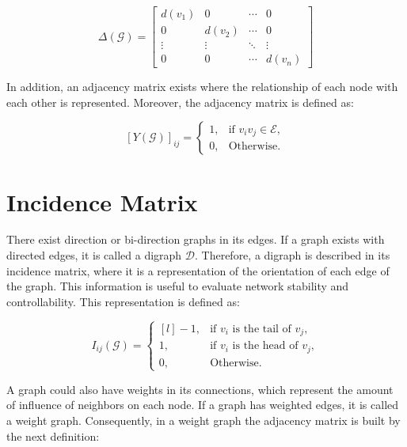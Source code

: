 \begin{equation}
    \Delta (\mathcal{G}) = \begin{bmatrix}
d(v_{1}) &   0    &  \cdots & 0\\ 
0      & d(v_{2}) & \cdots &  0 \\ 
\vdots & \vdots   & \ddots  & \vdots\\ 
0      & 0        & \cdots & d(v_{n}) 
  \end{bmatrix}
\end{equation}

In addition, an adjacency matrix exists where the relationship of each node with each other is represented. Moreover, the adjacency matrix is defined as:

\begin{equation}
    \left [ Y(\mathcal{G}) \right ]_{ij} = \left\{\begin{matrix}
1, & \text{if } v_{i}v_{j} \in \mathcal{E},\\ 
0, & \text{Otherwise.} 
\end{matrix}\right.
\end{equation}

\section*{Incidence Matrix}
There exist direction or bi-direction graphs in its edges. If a graph exists with directed edges, it is called a digraph $\mathcal{D}$. Therefore, a digraph is described in its incidence matrix, where it is a representation of the orientation of each edge of the graph. This information is useful to evaluate network stability and controllability. This representation is defined as:

\begin{equation}
    I_{ij}(\mathcal{G}) = \left\{\begin{matrix*}[l]
-1, & \text{if } v_{i} \text{ is the tail of } v_{j},\\ 
1, & \text{if } v_{i} \text{ is the head of } v_{j},\\ 
0, &  \text{Otherwise.   }
\end{matrix*}\right.
\end{equation}

A graph could also have weights in its connections, which represent the amount of influence of neighbors on each node. If a graph has weighted edges, it is called a weight graph. Consequently, in a weight graph the adjacency matrix is built by the next definition:



